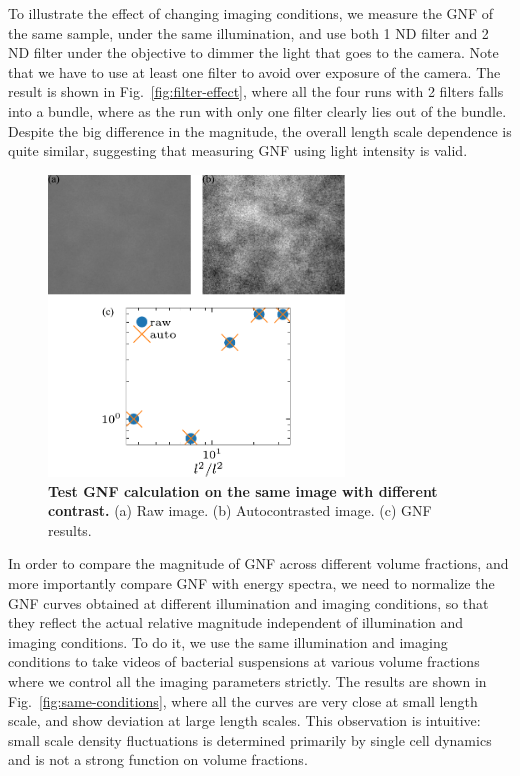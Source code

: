 \documentclass[preprint,aps,prl,amsmath,amssymb,longbibliography]{revtex4-2}
\begin{document}
To illustrate the effect of changing imaging conditions, we measure the GNF of the same sample, under the same illumination, and use both 1 ND filter and 2 ND filter under the objective to dimmer the light that goes to the camera. Note that we have to use at least one filter to avoid over exposure of the camera. The result is shown in Fig.~\ref{fig:filter-effect}, where all the four runs with 2 filters falls into a bundle, where as the run with only one filter clearly lies out of the bundle. Despite the big difference in the magnitude, the overall length scale dependence is quite similar, suggesting that measuring GNF using light intensity is valid.

\begin{figure}[!]
\begin{center}
\includegraphics[width=0.7\textwidth]{Figures/image-contrast/v1.pdf}
\caption[Density autocorrelation]
{
\textbf{Test GNF calculation on the same image with different contrast.}
(a) Raw image.
(b) Autocontrasted image.
(c) GNF results.
}
\label{fig:image-contrast}
\end{center}
\end{figure}

In order to compare the magnitude of GNF across different volume fractions, and more importantly compare GNF with energy spectra, we need to normalize the GNF curves obtained at different illumination and imaging conditions, so that they reflect the actual relative magnitude independent of illumination and imaging conditions. To do it, we use the same illumination and imaging conditions to take videos of bacterial suspensions at various volume fractions where we control all the imaging parameters strictly. The results are shown in Fig.~\ref{fig:same-conditions}, where all the curves are very close at small length scale, and show deviation at large length scales. This observation is intuitive: small scale density fluctuations is determined primarily by single cell dynamics and is not a strong function on volume fractions.
\end{document}
